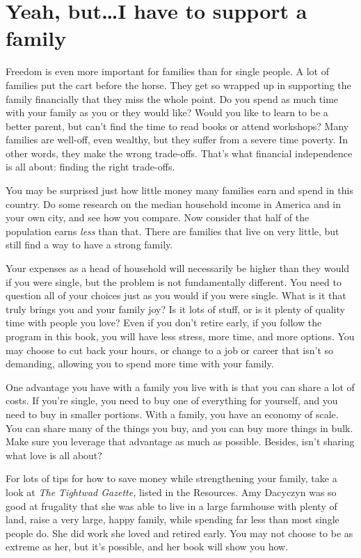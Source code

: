 \section{Yeah, but\ldots I have to support a family}
Freedom is even more important for families than for single people. A lot of families put the cart before the horse. They get so wrapped up in supporting the family financially that they miss the whole point. Do you spend as much time with your family as you or they would like? Would you like to learn to be a better parent, but can't find the time to read books or attend workshops? Many families are well-off, even wealthy, but they suffer from a severe time poverty. In other words, they make the wrong trade-offs. That's what financial independence is all about: finding the right trade-offs.

You may be surprised just how little money many families earn and spend in this country. Do some research on the median household income in America and in your own city, and see how you compare. Now consider that half of the population earns \emph{less} than that. There are families that live on very little, but still find a way to have a strong family.

Your expenses as a head of household will necessarily be higher than they would if you were single, but the problem is not fundamentally different. You need to question all of your choices just as you would if you were single. What is it that truly brings you and your family joy? Is it lots of stuff, or is it plenty of quality time with people you love? Even if you don't retire early, if you follow the program in this book, you will have less stress, more time, and more options. You may choose to cut back your hours, or change to a job or career that isn't so demanding, allowing you to spend more time with your family.

One advantage you have with a family you live with is that you can share a lot of costs. If you're single, you need to buy one of everything for yourself, and you need to buy in smaller portions. With a family, you have an economy of scale. You can share many of the things you buy, and you can buy more things in bulk. Make sure you leverage that advantage as much as possible. Besides, isn't sharing what love is all about?

For lots of tips for how to save money while strengthening your family, take a look at \emph{The Tightwad Gazette,} listed in the Resources. Amy Dacyczyn was so good at frugality that she was able to live in a large farmhouse with plenty of land, raise a very large, happy family, while spending far less than most single people do. She did work she loved and retired early. You may not choose to be as extreme as her, but it's possible, and her book will show you how.

